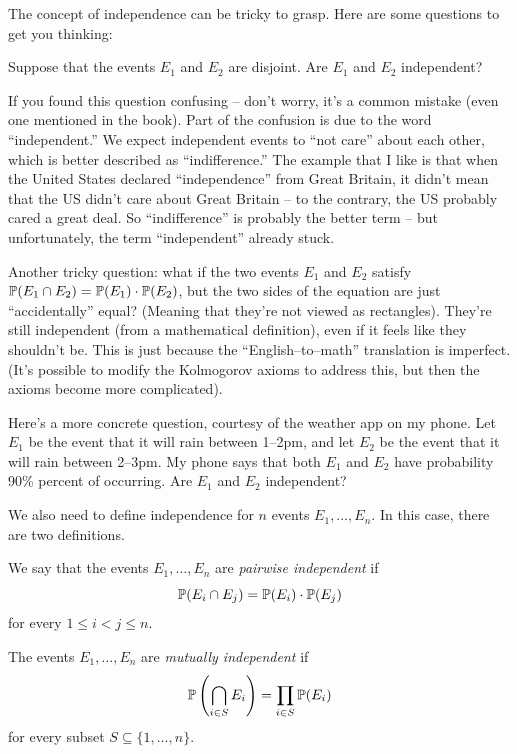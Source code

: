 \documentclass{ximera}
\begin{document}
The concept of independence can be tricky to grasp. Here are some questions to get you thinking:

Suppose that the events $E_1$ and $E_2$ are disjoint. Are $E_1$ and $E_2$ independent?
\begin{center}
\end{center}
If you found this question confusing -- don't worry, it's a common mistake (even one mentioned in the book). Part of the confusion is due to the word ``independent.'' We expect independent events to ``not care'' about each other, which is better described as ``indifference.'' The example that I like is that when the United States declared ``independence'' from Great Britain, it didn't mean that the US didn't care about Great Britain -- to the contrary, the US probably cared a great deal. So ``indifference'' is probably the better term -- but unfortunately, the term ``independent'' already stuck.

Another tricky question: what if the two events $E_1$ and $E_2$ satisfy $\mathbb{P}(E_1 \cap E_2) = \mathbb{P}(E_1) \cdot \mathbb{P}(E_2)$, but the two sides of the equation are just ``accidentally'' equal? (Meaning that they're not viewed as rectangles). They're still independent (from a mathematical definition), even if it feels like they shouldn't be. This is just because the ``English--to--math'' translation is imperfect. (It's possible to modify the Kolmogorov axioms to address this, but then the axioms become more complicated).

Here's a more concrete question, courtesy of the weather app on my phone. Let $E_1$ be the event that it will rain between 1--2pm, and let $E_2$ be the event that it will rain between 2--3pm. My phone says that both $E_1$ and $E_2$ have probability 90\% percent of occurring. Are $E_1$ and $E_2$ independent?


We also need to define independence for $n$ events $E_1,\ldots,E_n$. In this case, there are two definitions.

\begin{definition}
We say that the events $E_1,\ldots,E_n$ are \textit{pairwise independent} if 
$$
\mathbb{P}(E_i \cap E_j) = \mathbb{P}(E_i) \cdot \mathbb{P}(E_j)
$$
for every $1\leq i < j \leq n$.

The events $E_1,\ldots,E_n$ are \textit{mutually independent} if 
$$
\mathbb{P}\left(\bigcap_{i \in S} E_i\right) = \prod_{i \in S} \mathbb{P}(E_i)
$$
for every subset $S\subseteq \{1,\ldots,n\}$.
\end{definition}
\end{document}
